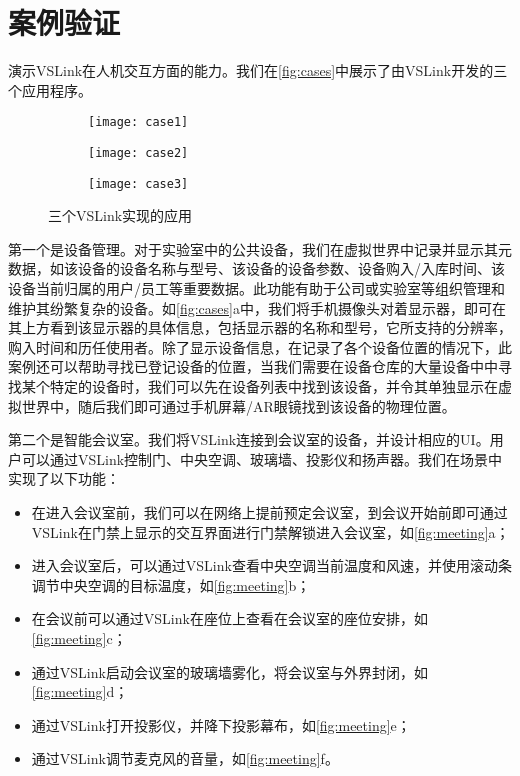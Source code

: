 \section{案例验证}
演示VSLink在人机交互方面的能力。我们在\autoref{fig:cases}中展示了由VSLink开发的三个应用程序。
\begin{figure}[htbp]
	\centering
	\begin{subfigure}{.65\linewidth}
		\texttt{[image: case1]}
		\caption{}
	\end{subfigure}
	\begin{subfigure}{.65\linewidth}
		\texttt{[image: case2]}
		\caption{}
	\end{subfigure}
	\begin{subfigure}{.65\linewidth}
		\texttt{[image: case3]}
		\caption{}
	\end{subfigure}
	\caption{三个VSLink实现的应用}\label{fig:cases}
\end{figure}
第一个是设备管理。对于实验室中的公共设备，我们在虚拟世界中记录并显示其元数据，如该设备的设备名称与型号、该设备的设备参数、设备购入/入库时间、该设备当前归属的用户/员工等重要数据。此功能有助于公司或实验室等组织管理和维护其纷繁复杂的设备。如\autoref{fig:cases}a中，我们将手机摄像头对着显示器，即可在其上方看到该显示器的具体信息，包括显示器的名称和型号，它所支持的分辨率，购入时间和历任使用者。除了显示设备信息，在记录了各个设备位置的情况下，此案例还可以帮助寻找已登记设备的位置，当我们需要在设备仓库的大量设备中中寻找某个特定的设备时，我们可以先在设备列表中找到该设备，并令其单独显示在虚拟世界中，随后我们即可通过手机屏幕/AR眼镜找到该设备的物理位置。

第二个是智能会议室。我们将VSLink连接到会议室的设备，并设计相应的UI。用户可以通过VSLink控制门、中央空调、玻璃墙、投影仪和扬声器。我们在场景中实现了以下功能：
\begin{itemize}
	\item 在进入会议室前，我们可以在网络上提前预定会议室，到会议开始前即可通过VSLink在门禁上显示的交互界面进行门禁解锁进入会议室，如\autoref{fig:meeting}a；
	\item 进入会议室后，可以通过VSLink查看中央空调当前温度和风速，并使用滚动条调节中央空调的目标温度，如\autoref{fig:meeting}b；
	\item 在会议前可以通过VSLink在座位上查看在会议室的座位安排，如\autoref{fig:meeting}c；
	\item 通过VSLink启动会议室的玻璃墙雾化，将会议室与外界封闭，如\autoref{fig:meeting}d；
	\item 通过VSLink打开投影仪，并降下投影幕布，如\autoref{fig:meeting}e；
	\item 通过VSLink调节麦克风的音量，如\autoref{fig:meeting}f。
\end{itemize}

